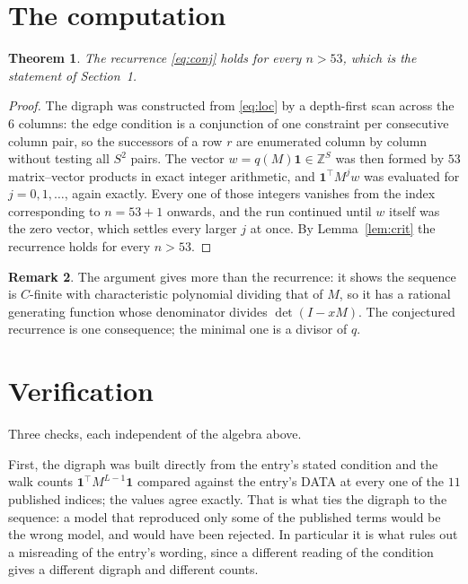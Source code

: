 \documentclass[11pt,a4paper]{article}
\theoremstyle{plain}
\newtheorem{theorem}{Theorem}
\theoremstyle{definition}
\newtheorem{remark}[theorem]{Remark}
\begin{document}
\section{The computation}

\begin{theorem}
The recurrence \eqref{eq:conj} holds for every $n>53$, which is the statement of
Section~1.
\end{theorem}

\begin{proof}
The digraph was constructed from \eqref{eq:loc} by a depth-first scan across the $6$
columns: the edge condition is a conjunction of one constraint per consecutive column
pair, so the successors of a row $r$ are enumerated column by column without testing all
$S^2$ pairs. The vector $w=q(M)\mathbf{1}\in\mathbb{Z}^{S}$ was then formed by $53$
matrix--vector products in exact integer arithmetic, and $\mathbf{1}^{\!\top}M^{j}w$ was
evaluated for $j=0,1,\dots$, again exactly. Every one of those integers vanishes from the
index corresponding to $n=53+1$ onwards, and the run continued until $w$ itself was the
zero vector, which settles every larger $j$ at once. By Lemma~\ref{lem:crit} the recurrence
holds for every $n>53$.
\end{proof}

\begin{remark}
The argument gives more than the recurrence: it shows the sequence is $C$-finite with
characteristic polynomial dividing that of $M$, so it has a rational generating function
whose denominator divides $\det(I-xM)$. The conjectured recurrence is one consequence; the
minimal one is a divisor of $q$.
\end{remark}

\section{Verification}

Three checks, each independent of the algebra above.

First, the digraph was built directly from the entry's stated condition and the walk counts
$\mathbf{1}^{\!\top}M^{L-1}\mathbf{1}$ compared against the entry's DATA at
every one of the $11$ published indices; the values agree exactly. That is what ties
the digraph to the sequence: a model that reproduced only some of the published terms would
be the wrong model, and would have been rejected. In particular it is what rules out a
misreading of the entry's wording, since a different reading of the condition gives a
different digraph and different counts.
\end{document}
